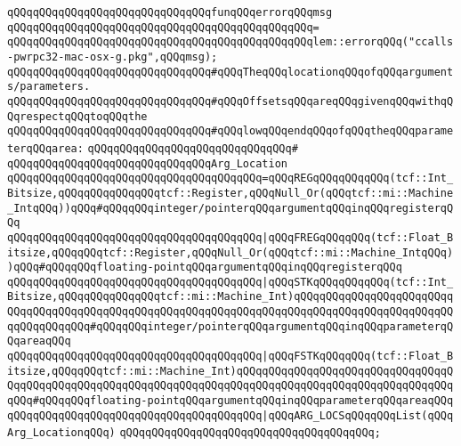 \newline
\newline
\verb|qQQqqQQqqQQqqQQqqQQqqQQqqQQqqQQqfunqQQqerrorqQQqmsg|\newline
\verb|qQQqqQQqqQQqqQQqqQQqqQQqqQQqqQQqqQQqqQQqqQQqqQQq=|\newline
\verb|qQQqqQQqqQQqqQQqqQQqqQQqqQQqqQQqqQQqqQQqqQQqqQQqlem::errorqQQq("ccalls-pwrpc32-mac-osx-g.pkg",qQQqmsg);|\newline
\newline
\verb|qQQqqQQqqQQqqQQqqQQqqQQqqQQqqQQq#qQQqTheqQQqlocationqQQqofqQQqarguments/parameters.|\newline
\verb|qQQqqQQqqQQqqQQqqQQqqQQqqQQqqQQq#qQQqOffsetsqQQqareqQQqgivenqQQqwithqQQqrespectqQQqtoqQQqthe|\newline
\verb|qQQqqQQqqQQqqQQqqQQqqQQqqQQqqQQq#qQQqlowqQQqendqQQqofqQQqtheqQQqparameterqQQqarea:|\newline
\verb|qQQqqQQqqQQqqQQqqQQqqQQqqQQqqQQq#|\newline
\verb|qQQqqQQqqQQqqQQqqQQqqQQqqQQqqQQqArg_Location|\newline
\verb|qQQqqQQqqQQqqQQqqQQqqQQqqQQqqQQqqQQqqQQq=qQQqREGqQQqqQQqqQQq(tcf::Int_Bitsize,qQQqqQQqqQQqqQQqtcf::Register,qQQqNull_Or(qQQqtcf::mi::Machine_IntqQQq))qQQq#qQQqqQQqinteger/pointerqQQqargumentqQQqinqQQqregisterqQQq|\newline
\verb|qQQqqQQqqQQqqQQqqQQqqQQqqQQqqQQqqQQqqQQq|\verb#|qQQqFREGqQQqqQQq(tcf::Float_Bitsize,qQQqqQQqtcf::Register,qQQqNull_Or(qQQqtcf::mi::Machine_IntqQQq))qQQq#\verb|#qQQqqQQqfloating-pointqQQqargumentqQQqinqQQqregisterqQQq|\newline
\verb|qQQqqQQqqQQqqQQqqQQqqQQqqQQqqQQqqQQqqQQq|\verb#|qQQqSTKqQQqqQQqqQQq(tcf::Int_Bitsize,qQQqqQQqqQQqqQQqtcf::mi::Machine_Int)qQQqqQQqqQQqqQQqqQQqqQQqqQQqqQQqqQQqqQQqqQQqqQQqqQQqqQQqqQQqqQQqqQQqqQQqqQQqqQQqqQQqqQQqqQQqqQQqqQQqqQQqqQQq#\verb|#qQQqqQQqinteger/pointerqQQqargumentqQQqinqQQqparameterqQQqareaqQQq|\newline
\verb|qQQqqQQqqQQqqQQqqQQqqQQqqQQqqQQqqQQqqQQq|\verb#|qQQqFSTKqQQqqQQq(tcf::Float_Bitsize,qQQqqQQqtcf::mi::Machine_Int)qQQqqQQqqQQqqQQqqQQqqQQqqQQqqQQqqQQqqQQqqQQqqQQqqQQqqQQqqQQqqQQqqQQqqQQqqQQqqQQqqQQqqQQqqQQqqQQqqQQqqQQqqQQq#\verb|#qQQqqQQqfloating-pointqQQqargumentqQQqinqQQqparameterqQQqareaqQQq|\newline
\verb|qQQqqQQqqQQqqQQqqQQqqQQqqQQqqQQqqQQqqQQq|\verb#|qQQqARG_LOCSqQQqqQQqList(qQQqArg_LocationqQQq)#\newline
\verb|qQQqqQQqqQQqqQQqqQQqqQQqqQQqqQQqqQQqqQQq;|\newline
